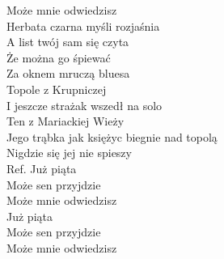 \begin{flushleft}
\hspace{0.9cm}Może mnie odwiedzisz \\
\vskip 3mm
Herbata czarna myśli rozjaśnia \\
A list twój sam się czyta \\
Że można go śpiewać \\
Za oknem mruczą bluesa \\
Topole z Krupniczej\\
\vskip 3mm
I jeszcze strażak wszedł na solo \\
Ten z Mariackiej Wieży \\
Jego trąbka jak księżyc biegnie nad topolą \\
Nigdzie się jej nie spieszy \\
\vskip 3mm
Ref. Już piąta\\
\hspace{0.9cm}Może sen przyjdzie \\
\hspace{0.9cm}Może mnie odwiedzisz \\
\hspace{0.9cm}Już piąta \\
\hspace{0.9cm}Może sen przyjdzie \\
\hspace{0.9cm}Może mnie odwiedzisz \\
\end{flushleft}
\clearpage
